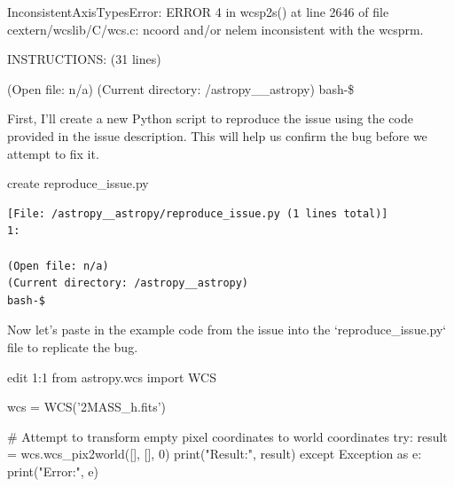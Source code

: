 {\begin{issuebox}
\begin{CodeVerbatim}[breaklines=true, breakanywhere=true]
InconsistentAxisTypesError: ERROR 4 in wcsp2s() at line 2646 of file cextern/wcslib/C/wcs.c:
ncoord and/or nelem inconsistent with the wcsprm.
\end{CodeVerbatim}
INSTRUCTIONS: (31 lines)

\begin{CodeVerbatim}[breaklines=true, breakanywhere=true]
(Open file: n/a)
(Current directory: /astropy__astropy)
bash-\$
\end{CodeVerbatim}
\end{issuebox}
\begin{agentbox}
First, I'll create a new Python script to reproduce the issue using the code provided in the issue description. This will help us confirm the bug before we attempt to fix it.

\hrulefill
\begin{CodeVerbatim}[breaklines=true, breakanywhere=true]
create reproduce_issue.py
\end{CodeVerbatim}
\end{agentbox}
\begin{observationbox}\begin{Verbatim}[breaklines=true, breakanywhere=true]
[File: /astropy__astropy/reproduce_issue.py (1 lines total)]
1:

(Open file: n/a)
(Current directory: /astropy__astropy)
bash-$
\end{Verbatim}
\end{observationbox}
\begin{agentbox}
Now let's paste in the example code from the issue into the `reproduce\_issue.py` file to replicate the bug.

\hrulefill
\begin{CodeVerbatim}[breaklines=true, breakanywhere=true]
edit 1:1
from astropy.wcs import WCS

wcs = WCS('2MASS_h.fits')

# Attempt to transform empty pixel coordinates to world coordinates
try:
    result = wcs.wcs_pix2world([], [], 0)
    print("Result:", result)
except Exception as e:
    print("Error:", e)


\end{CodeVerbatim}
\end{agentbox}}
